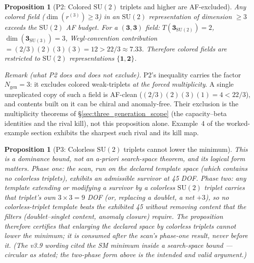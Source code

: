 \documentclass[11pt]{article}
\newtheorem{proposition}[theorem]{Proposition}
\theoremstyle{definition}
\newcommand{\SU}{\mathrm{SU}}
\begin{document}
\begin{proposition}[P2: Colored $\SU(2)$ triplets and higher are AF-excluded]
\label{prop:P2}
Any colored field ($\dim(r^{(3)}) \ge 3$) in an $\SU(2)$
representation of dimension $\ge 3$ exceeds the $\SU(2)$ AF budget.
For a $(\mathbf{3}, \mathbf{3})$ field: $T(\mathbf{3}_{\SU(2)}) = 2$,
$\dim(\mathbf{3}_{\SU(3)}) = 3$, Weyl-convention contribution
$= (2/3)(2)(3)(3) = 12 > 22/3 \approx 7.33$.  Therefore colored fields are
restricted to $\SU(2)$ representations $\{\mathbf{1}, \mathbf{2}\}$.
\end{proposition}

\noindent\emph{Remark (what P2 does and does not exclude).}  P2's inequality
carries the factor $N_{\mathrm{gen}} = 3$: it excludes colored weak-triplets
\emph{at the forced multiplicity}.  A single unreplicated copy of such a field
is AF-clean ($ (2/3)(2)(3)(1) = 4 < 22/3$), and contents built on it can be
chiral and anomaly-free.  Their exclusion is the multiplicity theorems of
\S\ref{sec:three_generation_scope} (the capacity--beta identities and the
rival kill), not this proposition alone.  Example~4 of the worked-example
section exhibits the sharpest such rival and its kill map.

\begin{proposition}[P3: Colorless $\SU(2)$ triplets cannot lower the minimum]
\label{prop:P3}
This is a \emph{dominance} bound, not an a-priori search-space
theorem, and its logical form matters.  Phase one: the scan, run on
the declared template space (which contains no colorless triplets),
exhibits an admissible survivor at 45 DOF.  Phase two: any template
extending or modifying a survivor by a colorless $\SU(2)$ triplet
carries that triplet's own $3 \times 3 = 9$ DOF (or, replacing a
doublet, a net $+3$), so no colorless-triplet template beats the
exhibited 45 without removing content that the filters
(doublet--singlet content, anomaly closure) require.  The proposition therefore certifies that
\emph{enlarging} the declared space by colorless triplets cannot lower
the minimum; it is consumed after the scan's phase-one result, never
before it.  (The v3.9 wording cited the SM minimum inside a
search-space bound --- circular as stated; the two-phase form above is
the intended and valid argument.)
\end{proposition}
\end{document}
